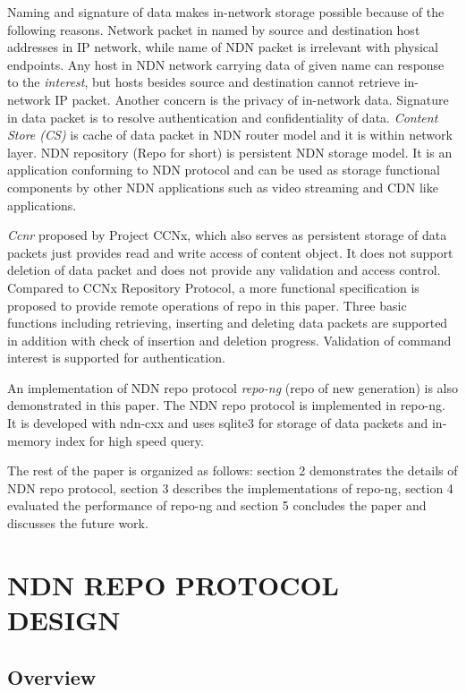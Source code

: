 \documentclass{acm_proc_article-sp}
\begin{document}
Naming and signature of data makes in-network storage possible because of the following reasons. Network packet in named by source and destination host addresses in IP network, while name of NDN packet is irrelevant with physical endpoints. Any host in NDN network carrying data of given name can response to the \emph{interest}, but hosts besides source and destination cannot retrieve in-network IP packet. Another concern is the privacy of in-network data. Signature in data packet is to resolve authentication and confidentiality of data. \emph{Content Store (CS)} is cache of data packet in NDN router model and it is within network layer. NDN repository (Repo for short) is persistent NDN storage model. It is an application conforming to NDN protocol and can be used as storage functional components by other NDN applications such as video streaming and CDN like applications.

\emph{Ccnr} proposed by Project CCNx, which also serves as persistent storage of data packets just provides read and write access of content object. It does not support deletion of data packet and does not provide any validation and access control. Compared to CCNx Repository Protocol, a more functional specification is proposed to provide remote operations of repo in this paper. Three basic functions including retrieving, inserting and deleting data packets are supported in addition with check of insertion and deletion progress. Validation of command interest is supported for authentication.

An implementation of NDN repo protocol \emph{repo-ng} (repo of new generation) is also demonstrated in this paper. The NDN repo protocol is implemented in repo-ng. It is developed with ndn-cxx and uses sqlite3 for storage of data packets and in-memory index for high speed query.

The rest of the paper is organized as follows: section 2 demonstrates the details of NDN repo protocol, section 3 describes the implementations of repo-ng, section 4 evaluated the performance of repo-ng and section 5 concludes the paper and discusses the future work.

\section{NDN REPO PROTOCOL DESIGN}
\subsection{Overview}
\end{document}
